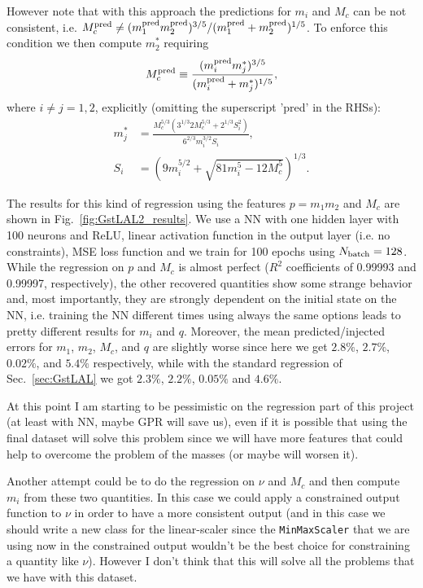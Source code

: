 \documentclass[prd,aps,twocolumn,a4paper,showkeys,nofootinbib]{article}
\begin{document}
However note that with this approach the predictions for $m_i$ and $M_c$ can be not
consistent, i.e. 
$M_c^{\rm pred} \neq (m_1^{\rm pred} m_2^{\rm pred})^{3/5}/(m_1^{\rm pred} + m_2^{\rm pred})^{1/5}$.
To enforce this condition we then compute $m_2^*$ requiring 
\begin{equation}
M_c^{\rm pred} \equiv \frac{(m_i^{\rm pred} m_j^*)^{3/5}}{(m_i^{\rm pred} + m_j^{*})^{1/5}},
\end{equation}
where $i\neq j=1,2$, explicitly (omitting the superscript 'pred' in the RHSs):
\begin{align}
m_j^* &= \frac{M_c^{5/3}\left(3^{1/3} 2 M_c^{5/3}+2^{1/3} S_i^2 \right) }{ 6^{2/3} m_i^{3/2} S_i },  \\
S_i   &= \left(9 m_i^{5/2} + \sqrt{81 m_i^5 -12 M_c^5}\right)^{1/3}.
\end{align}

The results for this kind of regression using the features $p=m_1 m_2$ and $M_c$
are shown in Fig.~\ref{fig:GstLAL2_results}. We use a NN with one hidden layer with 
100 neurons and ReLU, linear activation function in the output layer (i.e. no constraints),
MSE loss function and we train for 100 epochs using $N_{\rm batch}=128$. 
While the regression on $p$ and $M_c$ is almost perfect ($R^2$ coefficients of 0.99993 and 
0.99997, respectively), the other recovered quantities show some strange behavior and, most
importantly, they are strongly dependent on the initial state on the NN, i.e. training the NN
different times using always the same options leads to pretty different results for $m_i$ and $q$.
Moreover, the mean predicted/injected errors for $m_1$, $m_2$, $M_c$, and $q$ are slightly worse 
since here we get $2.8\%$, $2.7\%$, $0.02\%$, and $5.4\%$ respectively, while with the standard 
regression of Sec.~\ref{sec:GstLAL} we got $2.3\%$, $2.2\%$, $0.05\%$ and $4.6\%$.

At this point I am starting to be pessimistic on the regression part of this project 
(at least with NN, maybe GPR will save us), even if it is possible that using the final dataset
will solve this problem since we will have more features that could help to overcome the problem
of the masses (or maybe will worsen it). 

Another attempt could be to do the regression on $\nu$ and $M_c$ and then compute $m_i$
from these two quantities. 
In this case we could apply a constrained output function to $\nu$  in order to have a more
consistent output
(and in this case we should write a new class for the linear-scaler since the 
\texttt{MinMaxScaler} that we are using now in the constrained output wouldn't be the best 
choice for constraining a quantity like $\nu$). 
However I don't think that this will solve all the problems that we have
with this dataset.
\end{document}
